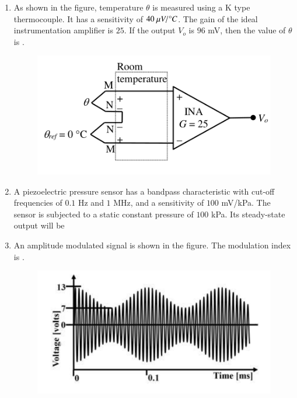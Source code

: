 \documentclass[journal,12pt,onecolumn]{IEEEtran}
\theoremstyle{remark}
\begin{document}
\begin{enumerate}
    \hfill{}

    \item As shown in the figure, temperature $\theta$ is measured using a K type thermocouple. It has a sensitivity of $40~\mu V/\degree C$. The gain  of the ideal instrumentation amplifier is $25$. If the output $V_{o}$ is $96$ mV, then the value of $\theta$  is \underline{\hspace{2cm}}.
    \begin{figure}[H]
        \centering
        \includegraphics[width=0.6\columnwidth]{q22.png}
        \caption*{}
        \label{fig:q22}
    \end{figure}
    
    \hfill{}

    \item A piezoelectric pressure sensor has a bandpass characteristic with cut-off frequencies of $0.1$ Hz and $1$ MHz, and a sensitivity of $100$ mV/kPa. The sensor is subjected to a static constant pressure of $100$ kPa. Its steady-state output will be
    
    \hfill{}
    \begin{enumerate}
    \end{enumerate}

    \item An amplitude modulated signal is shown in the figure. The modulation index is  \underline{\hspace{2cm}}.
    \begin{figure}[H]
        \centering
        \includegraphics[width=0.5\columnwidth]{q24.png}
        \caption*{}
        \label{fig:q24}
    \end{figure}
    

\end{enumerate}
\end{document}
